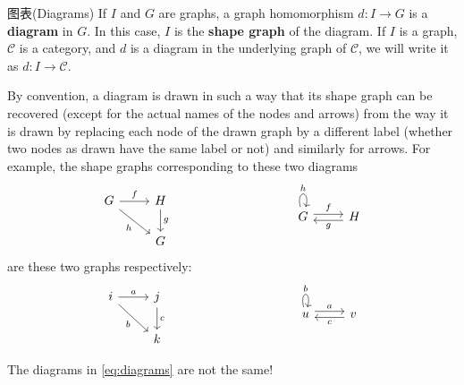 \documentclass{beamer}
\begin{document}
\begin{frame}{图表(Diagrams)}
If $I$ and $G$ are graphs, a graph homomorphism $d\colon I \to G$ is a \textbf{diagram} in $G$. In this case, $I$ is the \textbf{shape graph} of the diagram. If $I$ is a graph, $\mathcal{C}$ is a category, and $d$ is a diagram in the underlying graph of $\mathcal{C}$, we will write it as $d\colon I \to \mathcal{C}$.
\end{frame}

\begin{frame}[fragile]
By convention, a diagram is drawn in such a way that its shape graph can be recovered (except for the actual names of the nodes and arrows) from the way it is drawn by replacing each node of the drawn graph by a different label (whether two nodes as drawn have the same label or not) and similarly for arrows. For example, the shape graphs corresponding to these two diagrams
\begin{equation}\label{eq:diagrams}
\begin{minipage}[t]{0.45\textwidth}
\centering
\begin{tikzcd}
G \arrow[r, "f"] \arrow[dr, "h"'] & H \arrow[d, "g"] \\
& G
\end{tikzcd}
\end{minipage}
\hfill
\begin{minipage}[t]{0.45\textwidth}
\centering
\begin{tikzcd}
G \arrow[loop above, "h"] \arrow[r, shift left, "f"] & H \arrow[l, shift left, "g"]
\end{tikzcd}
\end{minipage}
\end{equation}
are these two graphs respectively:
\[
\begin{minipage}[t]{0.45\textwidth}
\centering
\begin{tikzcd}
i \arrow[r, "a"] \arrow[dr, "b"'] & j \arrow[d, "c"] \\
& k
\end{tikzcd}
\end{minipage}
\hfill
\begin{minipage}[t]{0.45\textwidth}
\centering
\begin{tikzcd}
u \arrow[loop above, "b"] \arrow[r, shift left, "a"] & v \arrow[l, shift left, "c"]
\end{tikzcd}
\end{minipage}
\]

The diagrams in \eqref{eq:diagrams} are not the same!
\end{frame}
\end{document}
